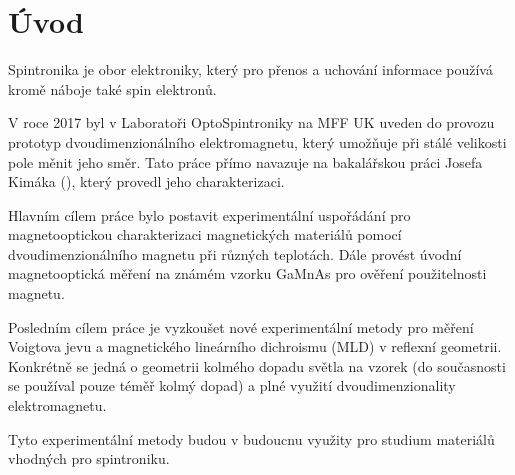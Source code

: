 \chapter*{Úvod}

Spintronika je obor elektroniky, který pro přenos a uchování informace používá kromě náboje také spin elektronů.

V roce 2017 byl v Laboratoři OptoSpintroniky na MFF UK uveden do provozu prototyp dvoudimenzionálního elektromagnetu, který umožňuje při stálé velikosti pole měnit jeho směr. Tato práce přímo navazuje na bakalářskou práci Josefa Kimáka (\cite{Kimak}), který provedl jeho charakterizaci.

Hlavním cílem práce bylo postavit experimentální uspořádání pro magnetooptickou charakterizaci magnetických materiálů pomocí dvoudimenzionálního magnetu při různých teplotách. Dále provést úvodní magnetooptická měření na známém vzorku GaMnAs pro ověření použitelnosti magnetu.

Posledním cílem práce je vyzkoušet nové experimentální metody pro měření Voigtova jevu a magnetického lineárního dichroismu (MLD) v reflexní geometrii. Konkrétně se jedná o geometrii kolmého dopadu světla na vzorek (do současnosti se používal pouze téměř kolmý dopad) a plné využití dvoudimenzionality elektromagnetu.

Tyto experimentální metody budou v budoucnu využity pro studium materiálů vhodných pro spintroniku.